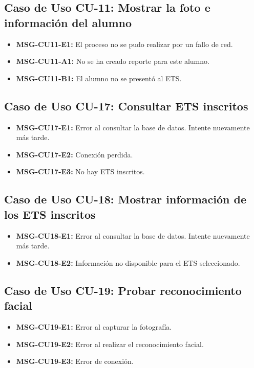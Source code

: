 \subsection{Caso de Uso CU-11: Mostrar la foto e información del alumno}
\begin{itemize}
	\item \textbf{\label{msg:CU11-E1}MSG-CU11-E1:} El proceso no se pudo realizar por un fallo de red.
	\item \textbf{\label{msg:CU11-A1}MSG-CU11-A1:} No se ha creado reporte para este alumno.
	\item \textbf{\label{msg:CU11-B1}MSG-CU11-B1:} El alumno no se presentó al ETS.
\end{itemize}

\subsection{Caso de Uso CU-17: Consultar ETS inscritos}
\begin{itemize}
	\item \textbf{\label{msg:CU17-E1}MSG-CU17-E1:} Error al consultar la base de datos. Intente nuevamente más tarde.
	\item \textbf{\label{msg:CU17-E2}MSG-CU17-E2:} Conexión perdida.
	\item \textbf{\label{msg:CU17-E3}MSG-CU17-E3:} No hay ETS inscritos.
\end{itemize}

\subsection{Caso de Uso CU-18: Mostrar información de los ETS inscritos}
\begin{itemize}
	\item \textbf{\label{msg:CU18-E1}MSG-CU18-E1:} Error al consultar la base de datos. Intente nuevamente más tarde.
	\item \textbf{\label{msg:CU18-E2}MSG-CU18-E2:} Información no disponible para el ETS seleccionado.
\end{itemize}

\subsection{Caso de Uso CU-19: Probar reconocimiento facial}
	\begin{itemize}
		\item \textbf{\label{msg:CU19-E1}MSG-CU19-E1:} Error al capturar la fotografía.
		\item \textbf{\label{msg:CU19-E2}MSG-CU19-E2:} Error al realizar el reconocimiento facial.
		\item \textbf{\label{msg:CU19-E3}MSG-CU19-E3:} Error de conexión.
	\end{itemize}
	
